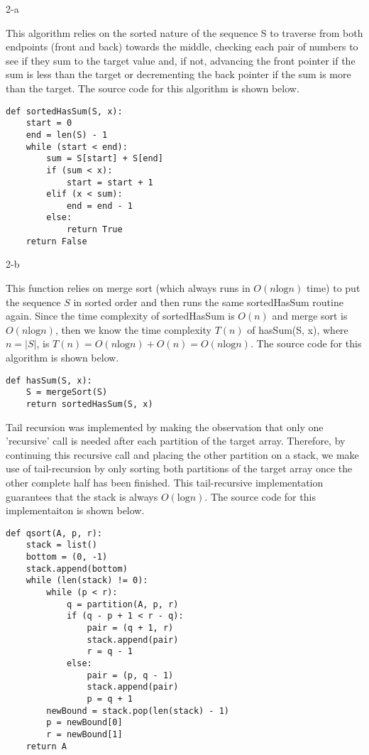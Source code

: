 \documentclass[11pt]{article}
\newcommand{\tlog}{\text{log}}
\begin{document}
\begin{prob}{2-a}
\end{prob}
\begin{sol}
This algorithm relies on the sorted nature of the sequence S to traverse from both endpoints (front and back) towards the middle, checking each pair of numbers to see if they sum to the target value and, if not, advancing the front pointer if the sum is less than the target or decrementing the back pointer if the sum is more than the target. The source code for this algorithm is shown below.
\begin{lstlisting}
def sortedHasSum(S, x):
	start = 0
	end = len(S) - 1
	while (start < end):
		sum = S[start] + S[end]
		if (sum < x):
			start = start + 1
		elif (x < sum):
			end = end - 1
		else:
			return True
	return False
\end{lstlisting}
\end{sol}

\begin{prob}{2-b}
\end{prob}
\begin{sol}
This function relies on merge sort (which always runs in $O(n\tlog n)$ time) to put the sequence $S$ in sorted order and then runs the same sortedHasSum routine again. Since the time complexity of sortedHasSum is $O(n)$ and merge sort is $O(n\tlog n)$, then we know the time complexity $T(n)$ of hasSum(S, x), where $n = |S|$, is $T(n) = O(n\tlog n) + O(n) = O(n\tlog n)$. The source code for this algorithm is shown below.

\begin{lstlisting}
def hasSum(S, x):
	S = mergeSort(S)
	return sortedHasSum(S, x)
\end{lstlisting}
\end{sol}

\begin{prob}{3}
\end{prob}
\begin{sol}
Tail recursion was implemented by making the observation that only one 'recursive' call is needed after each partition of the target array. Therefore, by continuing this recursive call and placing the other partition on a stack, we make use of tail-recursion by only sorting both partitions of the target array once the other complete half has been finished. This tail-recursive implementation guarantees that the stack is always $O(\tlog n)$. The source code for this implementaiton is shown below.

\begin{lstlisting}
def qsort(A, p, r):
	stack = list()
	bottom = (0, -1)
	stack.append(bottom)
	while (len(stack) != 0):
		while (p < r):
			q = partition(A, p, r)
			if (q - p + 1 < r - q):
				pair = (q + 1, r)
				stack.append(pair)
				r = q - 1
			else:
				pair = (p, q - 1)
				stack.append(pair)
				p = q + 1
		newBound = stack.pop(len(stack) - 1)
		p = newBound[0]
		r = newBound[1]
	return A
\end{lstlisting}
\end{sol}
\end{document}
